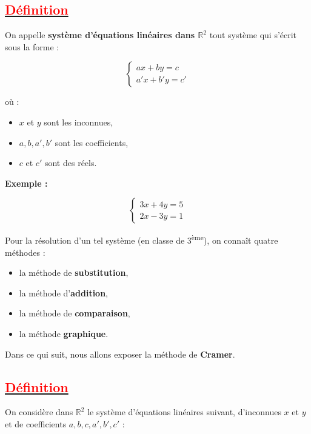 \documentclass[12pt,a4paper]{article}
\newcounter{solution}
\begin{document}
\subsection*{\underline{\textcolor{red}{Définition}}}

On appelle \textbf{système d’équations linéaires dans $\mathbb{R}^2$} 
tout système qui s’écrit sous la forme :

\[
\begin{cases}
ax + by = c \\
a'x + b'y = c'
\end{cases}
\]

où :

\begin{itemize}
    \item $x$ et $y$ sont les inconnues,
    \item $a, b, a', b'$ sont les coefficients,
    \item $c$ et $c'$ sont des réels.
\end{itemize}

\bigskip

\textbf{Exemple :}

\[
\begin{cases}
3x + 4y = 5 \\
2x - 3y = 1
\end{cases}
\]

\bigskip

Pour la résolution d’un tel système (en classe de 3\textsuperscript{ème}),
on connaît quatre méthodes :

\begin{itemize}
    \item la méthode de \textbf{substitution},
    \item la méthode d’\textbf {addition},
    \item la méthode de \textbf{comparaison},
    \item la méthode \textbf{graphique}.
\end{itemize}

\medskip

Dans ce qui suit, nous allons exposer la méthode de \textbf{Cramer}.
\subsection*{\underline{\textcolor{red}{Définition}}}

On considère dans $\mathbb{R}^2$ le système d’équations linéaires
suivant, d’inconnues $x$ et $y$ et de coefficients 
$a,b,c,a',b',c'$ :
\end{document}
